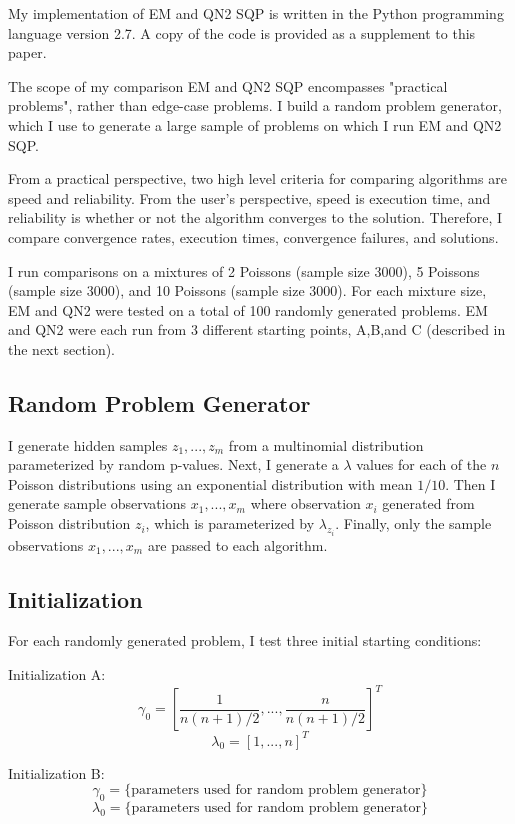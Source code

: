 \documentclass[letter,12pt]{article}
\begin{document}
My implementation of EM and QN2 SQP is written in the Python programming language version 2.7.  A copy of the code is provided as a supplement to this paper.

The scope of my comparison EM and QN2 SQP encompasses "practical problems", rather than edge-case problems.  I build a random problem generator, which I use to generate a large sample of problems on which I run EM and QN2 SQP.  

From a practical perspective, two high level criteria for comparing algorithms are speed and reliability.  From the user's perspective, speed is execution time, and reliability is whether or not the algorithm converges to the solution.  Therefore, I compare convergence rates, execution times, convergence failures, and solutions.

I run comparisons on a mixtures of 2 Poissons (sample size 3000), 5 Poissons (sample size 3000), and 10 Poissons (sample size 3000).  For each mixture size, EM and QN2 were tested on a total of 100 randomly generated problems.  EM and QN2 were each run from 3 different starting points, A,B,and C (described in the next section).

\subsection{Random Problem Generator}

I generate hidden samples $z_1,...,z_m$ from a multinomial distribution parameterized by random p-values.  Next, I generate a $\lambda$ values for each of the $n$ Poisson distributions using an exponential distribution with mean $1/10$.  Then I generate sample observations $x_1,...,x_m$ where observation $x_i$ generated from Poisson distribution $z_i$, which is parameterized by $\lambda_{z_i}$.  Finally, only the sample observations $x_1,...,x_m$ are passed to each algorithm.

\subsection{Initialization}

For each randomly generated problem, I test three initial starting conditions:

Initialization A:
\[
\gamma_0 = [\frac{1}{n(n+1)/2},...,\frac{n}{n(n+1)/2}]^T
\]
\[
\lambda_0 = [1,...,n]^T
\]

Initialization B:
\[
\gamma_0 = \{\text{parameters used for random problem generator}\}
\]
\[
\lambda_0 = \{\text{parameters used for random problem generator}\}
\]
\end{document}
